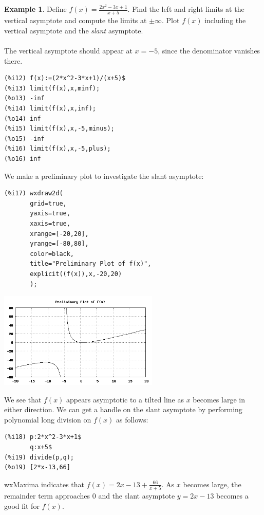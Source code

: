 \documentclass[10.5pt,twoside]{report}
\theoremstyle{definition}
\newtheorem{exmp}{Example}[section]
\begin{document}
\begin{exmp}  Define $f(x)=\frac{2x^2-3x+1}{x+5}$.  Find the left and right limits at the vertical asymptote and compute the limits at $\pm\infty$.  Plot $f(x)$ including the vertical asymptote and the \textit{slant} asymptote.\\
${}$\\

The vertical asymptote should appear at $x=-5$, since the denominator vanishes there.  

\begin{verbatim}
(%i12) f(x):=(2*x^2-3*x+1)/(x+5)$
(%i13) limit(f(x),x,minf);
(%o13) -inf
(%i14) limit(f(x),x,inf);
(%o14) inf
(%i15) limit(f(x),x,-5,minus);
(%o15) -inf
(%i16) limit(f(x),x,-5,plus);
(%o16) inf
\end{verbatim}

We make a preliminary plot to investigate the slant asymptote:

\begin{verbatim}
(%i17) wxdraw2d(
       grid=true,
       yaxis=true,
       xaxis=true,
       xrange=[-20,20],
       yrange=[-80,80],
       color=black,
       title="Preliminary Plot of f(x)",
       explicit((f(x)),x,-20,20)
       );
\end{verbatim}

\includegraphics[width=3in]{example_3_2_3_1}


We see that $f(x)$ appears asymptotic to a tilted line as $x$ becomes large in either direction. We can get a handle on the slant asymptote by performing polynomial long division on $f(x)$ as follows:

\begin{verbatim}
(%i18) p:2*x^2-3*x+1$
       q:x+5$
(%i19) divide(p,q);
(%o19) [2*x-13,66]
\end{verbatim}


wxMaxima indicates that $f(x)=2x-13+\frac{66}{x+5}$.  As $x$ becomes large, the remainder term approaches $0$ and the slant asymptote $y=2x-13$ becomes a good fit for $f(x)$.\\
${}$\\  


\end{exmp}
\end{document}
